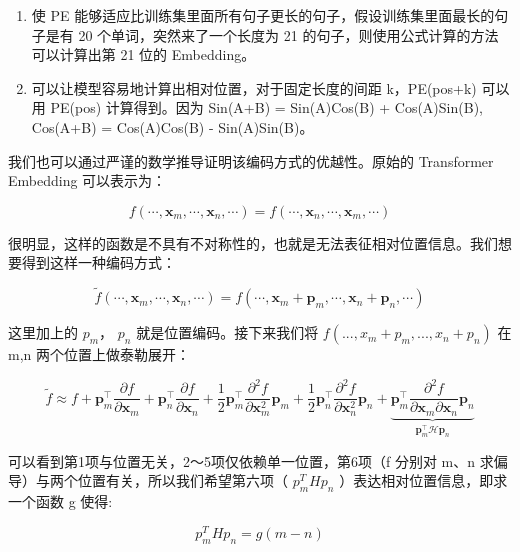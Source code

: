 \documentclass[12pt,a4paper]{book}
\begin{document}
\begin{enumerate}
\def\labelenumi{\arabic{enumi}.}
\tightlist
\item
  使 PE
  能够适应比训练集里面所有句子更长的句子，假设训练集里面最长的句子是有
  20 个单词，突然来了一个长度为 21
  的句子，则使用公式计算的方法可以计算出第 21 位的 Embedding。
\item
  可以让模型容易地计算出相对位置，对于固定长度的间距 k，PE(pos+k) 可以用
  PE(pos) 计算得到。因为 Sin(A+B) = Sin(A)Cos(B) + Cos(A)Sin(B),
  Cos(A+B) = Cos(A)Cos(B) - Sin(A)Sin(B)。
\end{enumerate}

我们也可以通过严谨的数学推导证明该编码方式的优越性。原始的 Transformer
Embedding 可以表示为：

\[
\begin{equation}f(\cdots,\boldsymbol{x}_m,\cdots,\boldsymbol{x}_n,\cdots)=f(\cdots,\boldsymbol{x}_n,\cdots,\boldsymbol{x}_m,\cdots)\end{equation}
\]

很明显，这样的函数是不具有不对称性的，也就是无法表征相对位置信息。我们想要得到这样一种编码方式：

\[
\begin{equation}\tilde{f}(\cdots,\boldsymbol{x}_m,\cdots,\boldsymbol{x}_n,\cdots)=f(\cdots,\boldsymbol{x}_m + \boldsymbol{p}_m,\cdots,\boldsymbol{x}_n + \boldsymbol{p}_n,\cdots)\end{equation}
\]

这里加上的 \(p_m\)， \(p_n\) 就是位置编码。接下来我们将
\(f(...,x_m+p_m,...,x_n+p_n)\) 在 m,n 两个位置上做泰勒展开：

\[
\begin{equation}\tilde{f}\approx f + \boldsymbol{p}_m^{\top} \frac{\partial f}{\partial \boldsymbol{x}_m} + \boldsymbol{p}_n^{\top} \frac{\partial f}{\partial \boldsymbol{x}_n} + \frac{1}{2}\boldsymbol{p}_m^{\top} \frac{\partial^2 f}{\partial \boldsymbol{x}_m^2}\boldsymbol{p}_m + \frac{1}{2}\boldsymbol{p}_n^{\top} \frac{\partial^2 f}{\partial \boldsymbol{x}_n^2}\boldsymbol{p}_n + \underbrace{\boldsymbol{p}_m^{\top} \frac{\partial^2 f}{\partial \boldsymbol{x}_m \partial \boldsymbol{x}_n}\boldsymbol{p}_n}_{\boldsymbol{p}_m^{\top} \boldsymbol{\mathcal{H}} \boldsymbol{p}_n}\end{equation}
\]

可以看到第1项与位置无关，2～5项仅依赖单一位置，第6项（f 分别对 m、n
求偏导）与两个位置有关，所以我们希望第六项（ \(p_m^THp_n\)
）表达相对位置信息，即求一个函数 g 使得:

\[
p_m^THp_n = g(m-n)
\]
\end{document}
